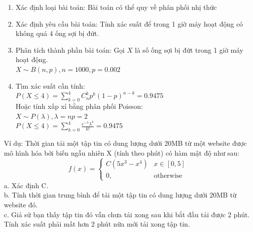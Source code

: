 \documentclass[12pt]{article}
\begin{document}
\begin{enumerate}
    \item Xác định loại bài toán: Bài toán có thể quy về phân phối nhị thức
    \item Xác định yêu cầu bài toán: Tính xác suất để trong 1 giờ máy hoạt động có không quá 4 ống sợi bị đứt.
    \item Phân tích thành phần bài toán:
    \subitem Gọi $X$ là số ống sợi bị đứt trong 1 giờ máy hoạt động.
    \\ $X \sim B(n, p), n = 1000, p = 0.002$
    \item Tìm xác suất cần tính: \\
    $P(X \leq 4) = \sum_{k=0}^{4} C_{n}^{k} p^k (1-p)^{n-k} = 0.9475$ \\
    Hoặc tính xấp xỉ bằng phân phối Poisson: \\
    $X \sim P(\lambda), \lambda = np = 2$ \\
    $P(X \leq 4) = \sum_{k=0}^{4} \frac{e^{-\lambda} \lambda^k}{k!} = 0.9475$

\end{enumerate}
Ví dụ: Thời gian tải một tập tin có dung lượng dưới 20MB từ một
website được mô hình hóa bởi biến ngẫu nhiên X (tính theo phút) có hàm mật độ
như sau:
\begin{equation}
    f(x) = \begin{cases}
        C(5x^3-x^4) & x \in [0, 5] \\
        0, & \text{otherwise}
    \end{cases}
\end{equation}
a. Xác định C. \\
b. Tính thời gian trung bình để tải một tập tin có dung lượng dưới 20MB từ
website đó. \\
c. Giả sử bạn thấy tập tin đó vẫn chưa tải xong sau khi bắt đầu tải được 2
phút. Tính xác suất phải mất hơn 2 phút nữa mới tải xong tập tin.
\end{document}
